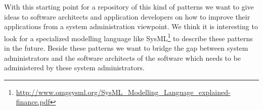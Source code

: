 With this starting point for a repository of this kind of patterns we want to give ideas to software architects and application developers on how to improve their applications from a system administration viewpoint. We think it is interesting to look for a specialized modelling language like SysML\footnote{\url{http://www.omgsysml.org/SysML_Modelling_Language_explained-finance.pdf}} to describe these patterns in the future. Beside these patterns we want to bridge the gap between system administrators and the software architects of the software which needs to be administered by these system administrators.
